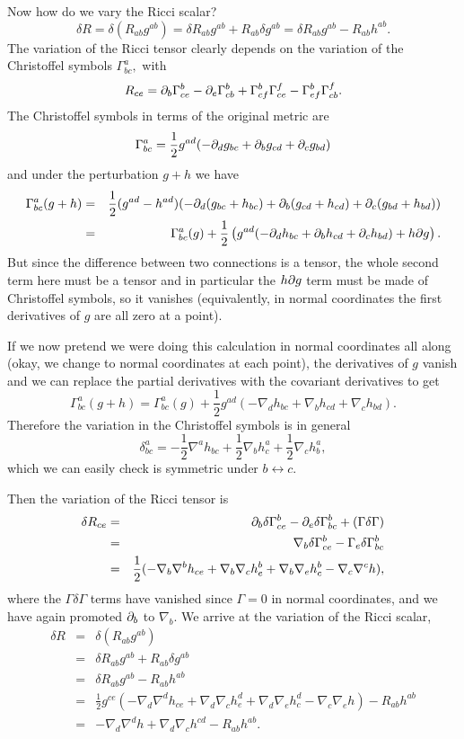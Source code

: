 Now how do we vary the Ricci scalar?
$$\delta R = \delta(R_{ab} g^{ab})=\delta R_{ab} g^{ab} +R_{ab} \delta g^{ab}= \delta R_{ab} g^{ab}-R_{ab} h^{ab}.$$
The variation of the Ricci tensor clearly depends on the variation of the Christoffel symbols $\Gamma^a_{bc},$ with
$$R_{ce}=\partial_b \Gamma^b_{ce}-\partial_e \Gamma^b_{cb}+\Gamma^b_{cf} \Gamma^f_{ce}-\Gamma^b_{ef}\Gamma^f_{cb}.$$
The Christoffel symbols in terms of the original metric are
$$\Gamma^a_{bc}=\frac{1}{2}g^{ad}(-\partial_d g_{bc}+\partial_b g_{cd} +\partial_c g_{bd})$$
and under the perturbation $g+h$ we have
\begin{eqnarray*}
\Gamma^a_{bc}(g+h)&=&\frac{1}{2}(g^{ad}-h^{ad})(-\partial_d (g_{bc}+h_{bc})+\partial_b (g_{cd}+h_{cd})+\partial_c(g_{bd}+h_{bd}))\\
&=&\Gamma^a_{bc}(g)+\frac{1}{2}\left(g^{ad}(-\partial_d h_{bc}+\partial_b h_{cd}+\partial_c h_{bd})+h\partial g\right).
\end{eqnarray*}
But since the difference between two connections is a tensor, the whole second term here must be a tensor and in particular the $h\partial g$ term must be made of Christoffel symbols, so it vanishes (equivalently, in normal coordinates the first derivatives of $g$ are all zero at a point).%

If we now pretend we were doing this calculation in normal coordinates all along (okay, we change to normal coordinates at each point), the derivatives of $g$ vanish and we can replace the partial derivatives with the covariant derivatives to get
$$\Gamma^a_{bc}(g+h)=\Gamma^a_{bc}(g)+\frac{1}{2}g^{ad}\left(-\nabla_d h_{bc}+\nabla_b h_{cd}+\nabla_c h_{bd}\right).$$
Therefore the variation in the Christoffel symbols is in general
$$\delta^a_{bc}=-\frac{1}{2} \nabla^a h_{bc} +\frac{1}{2} \nabla_b h^a_c +\frac{1}{2}\nabla_c h^a_b,$$
which we can easily check is symmetric under $b\leftrightarrow c$.

Then the variation of the Ricci tensor is
\begin{eqnarray*}
\delta R_{ce}&=& \partial_b \delta \Gamma^b_{ce} -\partial_e \delta \Gamma^b_{bc} +(\Gamma \delta \Gamma)\\
&=& \nabla_b \delta \Gamma^b_{ce} -\Gamma_e \delta \Gamma^b_{bc}\\
&=&\frac{1}{2} (-\nabla_b \nabla^b h_{ce} +\nabla_b \nabla_c h^b_e + \nabla_b \nabla_e h^b_c - \nabla_c \nabla^c h),
\end{eqnarray*}
where the $\Gamma \delta \Gamma$ terms have vanished since $\Gamma=0$ in normal coordinates, and we have again promoted $\partial_b$ to $\nabla_b$.
We arrive at the variation of the Ricci scalar,
\begin{eqnarray*}
\delta R &=& \delta (R_{ab} g^{ab})\\
&=&\delta R_{ab} g^{ab} + R_{ab} \delta g^{ab}\\
&=& \delta R_{ab} g^{ab} -R_{ab} h^{ab}\\
&=& \frac{1}{2}g^{ce} (-\nabla_d \nabla^d h_{ce} +\nabla_d \nabla_c h^d_e + \nabla_d \nabla_e h^d_c -\nabla_c \nabla_e h)-R_{ab} h^{ab}\\
&=& -\nabla_d \nabla^d h + \nabla_d \nabla_c h^{cd}-R_{ab} h^{ab}.
\end{eqnarray*}

